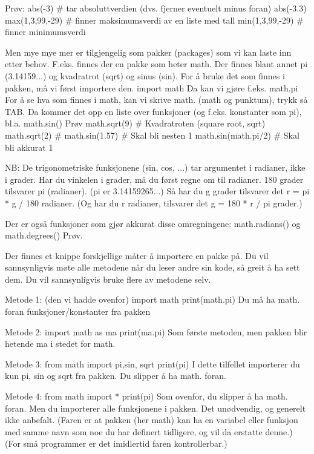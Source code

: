 \documentclass[a4paper,11pt,utf8]{book}
\begin{document}
Prøv: 
abs(-3)          # tar absoluttverdien (dvs. fjerner eventuelt minus foran)
abs(-3.3)
max(1,3,99,-29)  # finner maksimumsverdi av en liste med tall
min(1,3,99,-29)  # finner minimumsverdi 


Men mye mye mer er tilgjengelig som pakker (packages) som vi kan laste inn etter behov.
F.eks. finnes der en pakke som heter math.
Der finnes blant annet pi (3.14159...) og kvadratrot (sqrt) og sinus (sin). 
For å bruke det som finnes i pakken, må vi først importere den. 
import math
Da kan vi gjøre f.eks.
math.pi 
For å se hva som finnes i math, kan vi skrive math. (math og punktum), trykk så TAB.
Da kommer det opp en liste over funksjoner (og f.eks. konstanter som pi), bl.a. math.sin()
Prøv
math.sqrt(9)         # Kvadratroten (square root, sqrt)
math.sqrt(2)         # 
math.sin(1.57)       # Skal bli nesten 1
math.sin(math.pi/2)  # Skal bli akkurat 1

NB: De trigonometriske funksjonene (sin, cos, ...) tar argumentet i radianer,
ikke i grader. 
Har du vinkelen i grader, må du først regne om til radianer.
180 grader tilsvarer pi (radianer). (pi er 3.14159265...) 
Så har du g grader tilsvarer det r = pi * g / 180  radianer.
(Og har du r radianer, tilsvarer det g = 180 * r / pi  grader.) 

Der er også funksjoner som gjør akkurat disse omregningene: 
math.radians() og math.degrees()
Prøv. 

Der finnes et knippe forskjellige måter å importere en pakke på.
Du vil sannsynligvis møte alle metodene når du leser andre sin kode,
så greit å ha sett dem. 
Du vil sannsynligvis bruke flere av metodene selv.

Metode 1: (den vi hadde ovenfor)
import math
print(math.pi)
Du må ha math. foran funksjoner/konstanter fra pakken

Metode 2:
import math as ma
print(ma.pi)
Som første metoden, men pakken blir hetende ma i stedet for math.

Metode 3:
from math import pi,sin, sqrt
print(pi)
I dette tilfellet importerer du kun pi, sin og sqrt fra pakken.
Du slipper å ha math. foran. 

Metode 4:
from math import *
print(pi)
Som ovenfor, du slipper å ha math. foran.
Men du importerer alle funksjonene i pakken. 
Det unødvendig, og generelt ikke anbefalt.
(Faren er at pakken (her math) kan ha en variabel eller funksjon med samme navn
som noe du har definert tidligere, og vil da erstatte denne.) 
(For små programmer er det imidlertid faren kontrollerbar.) 
\end{document}
